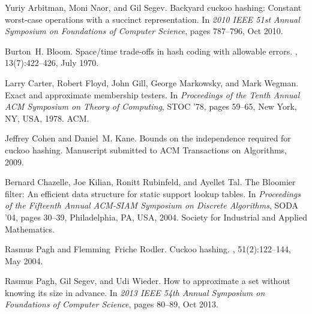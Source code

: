 \documentclass[11pt]{article}
\begin{document}
\newcommand{\etalchar}[1]{$^{#1}$}
\begin{thebibliography}{CKRT04}

Yuriy Arbitman, Moni Naor, and Gil Segev.
\newblock Backyard cuckoo hashing: Constant worst-case operations with a
  succinct representation.
\newblock In {\em 2010 IEEE 51st Annual Symposium on Foundations of Computer
  Science}, pages 787--796, Oct 2010.

Burton~H. Bloom.
\newblock Space/time trade-offs in hash coding with allowable errors.
, 13(7):422--426, July 1970.

\bibitem[CFG{\etalchar{+}}78]{Carter1978}
Larry Carter, Robert Floyd, John Gill, George Markowsky, and Mark Wegman.
\newblock Exact and approximate membership testers.
\newblock In {\em Proceedings of the Tenth Annual ACM Symposium on Theory of
  Computing}, STOC '78, pages 59--65, New York, NY, USA, 1978. ACM.

Jeffrey Cohen and Daniel~M. Kane.
\newblock Bounds on the independence required for cuckoo hashing.
\newblock Manuscript submitted to ACM Transactions on Algorithms, 2009.

Bernard Chazelle, Joe Kilian, Ronitt Rubinfeld, and Ayellet Tal.
\newblock The {B}loomier filter: An efficient data structure for static support
  lookup tables.
\newblock In {\em Proceedings of the Fifteenth Annual ACM-SIAM Symposium on
  Discrete Algorithms}, SODA '04, pages 30--39, Philadelphia, PA, USA, 2004.
  Society for Industrial and Applied Mathematics.

Rasmus Pagh and Flemming~Friche Rodler.
\newblock Cuckoo hashing.
, 51(2):122--144, May 2004.

Rasmus Pagh, Gil Segev, and Udi Wieder.
\newblock How to approximate a set without knowing its size in advance.
\newblock In {\em 2013 IEEE 54th Annual Symposium on Foundations of Computer
  Science}, pages 80--89, Oct 2013.

\end{thebibliography}
\end{document}
